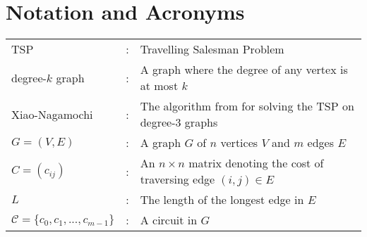 \chapter*{Notation and Acronyms}

\begin{tabular}{lcl}
TSP                 &:     & Travelling Salesman Problem\\
degree-$k$ graph    &:     & A graph where the degree of any vertex is at most $k$\\
Xiao-Nagamochi      &:     & The algorithm from \cite{xiao2016degree3} for solving the TSP on degree-$3$ graphs\\
$G = (V,E)$         &:     & A graph $G$ of $n$ vertices $V$ and $m$ edges $E$\\
$C = (c_{ij})$                 &:     & An $n \times n$ matrix denoting the cost of traversing edge $(i, j) \in E$\\
$L$                 &:     & The length of the longest edge in $E$\\
$\mathcal{C} = \{c_0,c_1,...,c_{m-1}\}$                 &:     & A circuit in $G$\\
\end{tabular}
